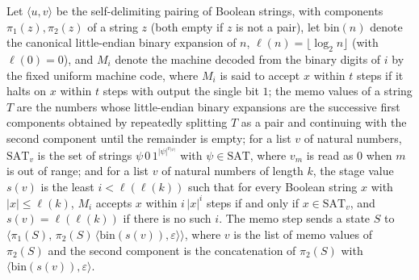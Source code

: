 \begin{definition}
\label{Complexity.ladner_memoStep}
\leanok
{}
Let $\langle u,v\rangle$ be the self-delimiting pairing of Boolean strings, with components $\pi_1(z),\pi_2(z)$ of a string $z$ (both empty if $z$ is not a pair), let $\mathrm{bin}(n)$ denote the canonical little-endian binary expansion of $n$, $\ell(n)=\lfloor\log_2 n\rfloor$ (with $\ell(0)=0$), and $M_i$ denote the machine decoded from the binary digits of $i$ by the fixed uniform machine code, where $M_i$ is said to accept $x$ within $t$ steps if it halts on $x$ within $t$ steps with output the single bit $1$; the memo values of a string $T$ are the numbers whose little-endian binary expansions are the successive first components obtained by repeatedly splitting $T$ as a pair and continuing with the second component until the remainder is empty; for a list $v$ of natural numbers, $\mathrm{SAT}_v$ is the set of strings $\psi\,0\,1^{|\psi|^{v_{|\psi|}}}$ with $\psi\in\mathrm{SAT}$, where $v_m$ is read as $0$ when $m$ is out of range; and for a list $v$ of natural numbers of length $k$, the stage value $s(v)$ is the least $i<\ell(\ell(k))$ such that for every Boolean string $x$ with $|x|\le\ell(k)$, $M_i$ accepts $x$ within $i\,|x|^i$ steps if and only if $x\in\mathrm{SAT}_v$, and $s(v)=\ell(\ell(k))$ if there is no such $i$. The memo step sends a state $S$
to $\langle\pi_1(S),\,\pi_2(S)\,\langle\mathrm{bin}(s(v)),\varepsilon\rangle\rangle$, where $v$ is
the list of memo values of $\pi_2(S)$ and the second component is the concatenation of
$\pi_2(S)$ with $\langle\mathrm{bin}(s(v)),\varepsilon\rangle$.
\end{definition}

